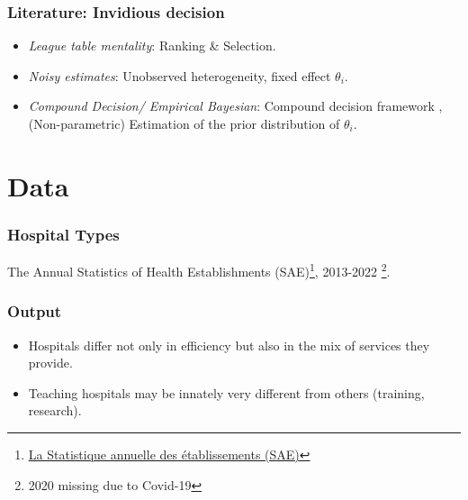 \documentclass[10pt,mathserif,aspectratio=169]{beamer}
\begin{document}
\begin{frame}
  \frametitle{Literature: Invidious decision}
  \begin{itemize}\itemsep=12pt
    \item \textit{League table mentality}: Ranking \& Selection.\citep{gu2023invidious}
    \item \textit{Noisy estimates}: Unobserved heterogeneity, fixed effect $\theta_i$. \citep{chetty2014measuring,kline2022systemic}
    \item \textit{Compound Decision/ Empirical Bayesian}: Compound decision framework \citep{robbins1956empirical}, (Non-parametric) Estimation of the prior distribution of $\theta_i$. \citep{koenker2014convex, gu2017empirical}
  \end{itemize}
\end{frame}

\section{Data}

\begin{frame}
  \frametitle{Hospital Types}
  The Annual Statistics of Health
  Establishments
  (SAE)\footnote{\href{https://data.drees.solidarites-sante.gouv.fr/explore/dataset/708_bases-statistiques-sae/information/}{La
      Statistique annuelle des établissements (SAE)}}, 2013-2022 \footnote{2020 missing due to Covid-19}.
  \begin{table}

    \begin{adjustbox}{width=0.8\textwidth,center}
      \centering
      
    \end{adjustbox}
  \end{table}
\end{frame}

\begin{frame}[label=output]
  \frametitle{Output}

  \begin{table}
    \begin{adjustbox}{width=0.9\textwidth,center}
      \centering
      
    \end{adjustbox}
  \end{table}
  \begin{itemize}\itemsep = 8pt
    \item Hospitals differ not only in efficiency but also in the mix of services they
          provide.
    \item Teaching hospitals may be innately very different from others (training,
          research).
  \end{itemize}
  \hyperlink{reg_sep}{}
\end{frame}
\end{document}
